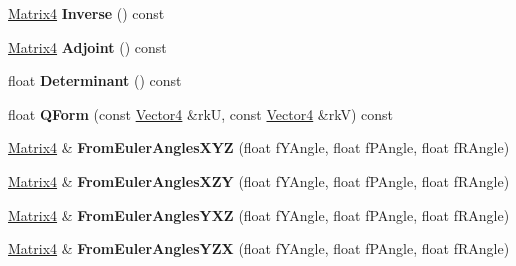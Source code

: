 \begin{DoxyCompactItemize}
\item 
\hyperlink{class_magnum_1_1_matrix4}{Matrix4} {\bfseries Inverse} () const \hypertarget{class_magnum_1_1_matrix4_a4f3281840519451dfac286f69a04e1ba}{}\label{class_magnum_1_1_matrix4_a4f3281840519451dfac286f69a04e1ba}

\item 
\hyperlink{class_magnum_1_1_matrix4}{Matrix4} {\bfseries Adjoint} () const \hypertarget{class_magnum_1_1_matrix4_a836971803f020fe9cb250826af2a68f2}{}\label{class_magnum_1_1_matrix4_a836971803f020fe9cb250826af2a68f2}

\item 
float {\bfseries Determinant} () const \hypertarget{class_magnum_1_1_matrix4_a341cc74b1f7c47d55646aadaeff4de38}{}\label{class_magnum_1_1_matrix4_a341cc74b1f7c47d55646aadaeff4de38}

\item 
float {\bfseries Q\+Form} (const \hyperlink{class_magnum_1_1_vector4}{Vector4} \&rkU, const \hyperlink{class_magnum_1_1_vector4}{Vector4} \&rkV) const \hypertarget{class_magnum_1_1_matrix4_a99ec5ea725aec8ba4dde74b1d984b13f}{}\label{class_magnum_1_1_matrix4_a99ec5ea725aec8ba4dde74b1d984b13f}

\item 
\hyperlink{class_magnum_1_1_matrix4}{Matrix4} \& {\bfseries From\+Euler\+Angles\+X\+YZ} (float f\+Y\+Angle, float f\+P\+Angle, float f\+R\+Angle)\hypertarget{class_magnum_1_1_matrix4_a2b811ae8a9c103a213326e1e64672d24}{}\label{class_magnum_1_1_matrix4_a2b811ae8a9c103a213326e1e64672d24}

\item 
\hyperlink{class_magnum_1_1_matrix4}{Matrix4} \& {\bfseries From\+Euler\+Angles\+X\+ZY} (float f\+Y\+Angle, float f\+P\+Angle, float f\+R\+Angle)\hypertarget{class_magnum_1_1_matrix4_ab696474e2545f9ca7b15d68a833d56fa}{}\label{class_magnum_1_1_matrix4_ab696474e2545f9ca7b15d68a833d56fa}

\item 
\hyperlink{class_magnum_1_1_matrix4}{Matrix4} \& {\bfseries From\+Euler\+Angles\+Y\+XZ} (float f\+Y\+Angle, float f\+P\+Angle, float f\+R\+Angle)\hypertarget{class_magnum_1_1_matrix4_ab2ada8981b89b0cf64e0e7721d47aa9e}{}\label{class_magnum_1_1_matrix4_ab2ada8981b89b0cf64e0e7721d47aa9e}

\item 
\hyperlink{class_magnum_1_1_matrix4}{Matrix4} \& {\bfseries From\+Euler\+Angles\+Y\+ZX} (float f\+Y\+Angle, float f\+P\+Angle, float f\+R\+Angle)\hypertarget{class_magnum_1_1_matrix4_a6769cea7981a4b03bae6dc870401c7f2}{}\label{class_magnum_1_1_matrix4_a6769cea7981a4b03bae6dc870401c7f2}


\end{DoxyCompactItemize}

